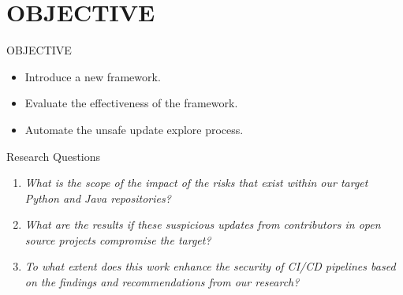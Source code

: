 \section{OBJECTIVE}
\begin{frame}{OBJECTIVE}
  \begin{itemize}
    \item Introduce a new framework.
    \item Evaluate the effectiveness of the framework.
    \item Automate the unsafe update explore process.
  \end{itemize}
  \begin{block}{Research Questions}
    \begin{enumerate}
      \item \emph{What is the scope of the impact of the risks that exist within our target Python and Java repositories?}
      \item \emph{What are the results if these suspicious updates from contributors in open source projects compromise the target?}
      \item \emph{To what extent does this work enhance the security of CI/CD pipelines based on the findings and recommendations from our research?}
    \end{enumerate}
  \end{block}
\end{frame}